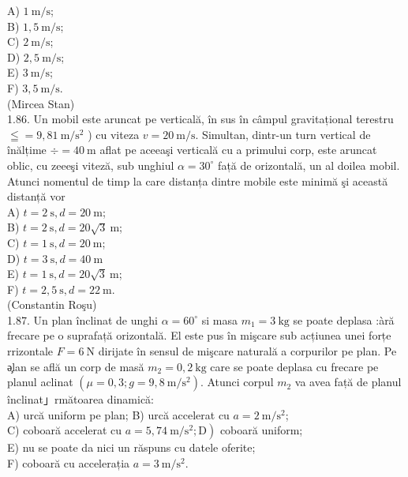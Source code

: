 \documentclass[10pt]{article}
\begin{document}
A) $1 \mathrm{~m} / \mathrm{s}$;\\
B) $1,5 \mathrm{~m} / \mathrm{s}$;\\
C) $2 \mathrm{~m} / \mathrm{s}$;\\
D) $2,5 \mathrm{~m} / \mathrm{s}$;\\
E) $3 \mathrm{~m} / \mathrm{s}$;\\
F) $3,5 \mathrm{~m} / \mathrm{s}$.\\
(Mircea Stan)\\
1.86. Un mobil este aruncat pe verticală, în sus în câmpul gravitațional terestru $\leqq=9,81 \mathrm{~m} / \mathrm{s}^{2}$ ) cu viteza $v=20 \mathrm{~m} / \mathrm{s}$. Simultan, dintr-un turn vertical de înălțime $\div=40 \mathrm{~m}$ aflat pe aceeaşi verticală cu a primului corp, este aruncat oblic, cu zeeeşi viteză, sub unghiul $\alpha=30^{\circ}$ față de orizontală, un al doilea mobil. Atunci nomentul de timp la care distanța dintre mobile este minimă şi această distanță vor\\
A) $t=2 \mathrm{~s}, d=20 \mathrm{~m}$;\\
B) $t=2 \mathrm{~s}, d=20 \sqrt{3} \mathrm{~m}$;\\
C) $t=1 \mathrm{~s}, d=20 \mathrm{~m}$;\\
D) $t=3 \mathrm{~s}, d=40 \mathrm{~m}$\\
E) $t=1 \mathrm{~s}, d=20 \sqrt{3} \mathrm{~m}$;\\
F) $t=2,5 \mathrm{~s}, d=22 \mathrm{~m}$.\\
(Constantin Roşu)\\
1.87. Un plan înclinat de unghi $\alpha=60^{\circ}$ si masa $m_{1}=3 \mathrm{~kg}$ se poate deplasa :àră frecare pe o suprafață orizontală. El este pus în mişcare sub acțiunea unei forțe rrizontale $F=6 \mathrm{~N}$ dirijate în sensul de mişcare naturală a corpurilor pe plan. Pe ә̧lan se află un corp de masă $m_{2}=0,2 \mathrm{~kg}$ care se poate deplasa cu frecare pe planul aclinat $\left(\mu=0,3 ; g=9,8 \mathrm{~m} / \mathrm{s}^{2}\right)$. Atunci corpul $m_{2}$ va avea față de planul înclinat」rmătoarea dinamică:\\
A) urcă uniform pe plan; B) urcă accelerat cu $a=2 \mathrm{~m} / \mathrm{s}^{2}$;\\
C) coboară accelerat cu $\left.a=5,74 \mathrm{~m} / \mathrm{s}^{2} ; \mathrm{D}\right)$ coboară uniform;\\
E) nu se poate da nici un răspuns cu datele oferite;\\
F) coboară cu accelerația $a=3 \mathrm{~m} / \mathrm{s}^{2}$.\\
\end{document}

